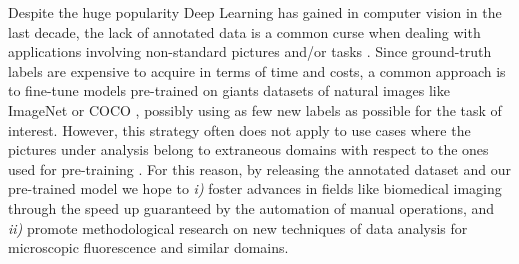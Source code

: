 Despite the huge popularity Deep Learning has gained in computer vision in the last decade, the lack of annotated data is a common curse when dealing with applications involving non-standard pictures and/or tasks \cite{curse_dataset_annotation}. 
Since ground-truth labels are expensive to acquire in terms of time and costs, a common approach is to fine-tune models pre-trained on giants datasets of natural images like ImageNet \cite{ImageNet} or COCO \cite{COCO}, possibly using as few new labels as possible for the task of interest. 
However, this strategy often does not apply to use cases where the pictures under analysis belong to extraneous domains with respect to the ones used for pre-training \cite{TL_medical_imaging}.
For this reason, by releasing the annotated dataset and our pre-trained model we hope to \textit{i)} foster advances in fields like biomedical imaging through the speed up guaranteed by the automation of manual operations, and \textit{ii)} promote methodological research on new techniques of data analysis for microscopic fluorescence and similar domains.